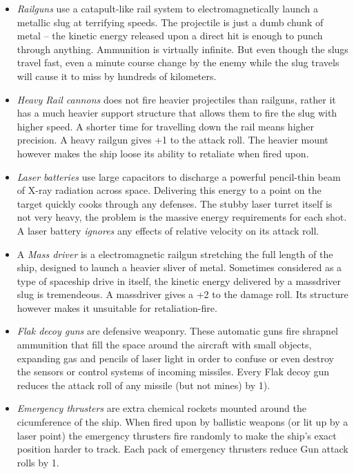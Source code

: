 \documentclass[a4paper,12pt,notitlepage,twocolumn]{article}
\begin{document}
\begin{itemize}

\item \emph{Railguns} use a catapult-like rail system to electromagnetically launch a
  metallic slug at terrifying speeds. The projectile is just a dumb chunk of metal --
  the kinetic energy released upon a direct hit is enough to punch
  through anything. Ammunition is virtually infinite. But even though
  the slugs travel fast, even a minute course change by the enemy while the slug
  travels will cause it to miss by hundreds of kilometers. 
\item \emph{Heavy Rail cannons} does not fire
  heavier projectiles than railguns, rather it has a much heavier
  support structure that allows them to fire the slug with higher speed. A
  shorter time for travelling down the rail means higher precision. A
  heavy railgun gives +1 to the attack roll. The heavier mount however
  makes the ship loose its ability to retaliate when fired upon.
\item \emph{Laser batteries} use large capacitors to discharge a
  powerful pencil-thin beam of X-ray radiation across
  space. Delivering this energy to a point on the target quickly cooks
  through any defenses. The stubby laser turret itself is not very
  heavy, the problem is the massive energy requirements for each
  shot. A laser battery \emph{ignores} any effects of relative
  velocity on its attack roll.
\item A \emph{Mass driver} is a electromagnetic railgun stretching the
  full length of the ship, designed to launch a heavier sliver of
  metal. Sometimes considered as a type of spaceship drive in itself,
  the kinetic energy delivered by a massdriver slug is tremendeous. A
  massdriver gives a +2 to the damage roll. Its structure however
  makes it unsuitable for retaliation-fire. 
\item \emph{Flak decoy guns} are defensive weaponry. These automatic
  guns fire shrapnel ammunition that fill the space around the
  aircraft with small objects, expanding gas and pencils of laser light in order to
  confuse or even destroy the sensors or control systems of incoming missiles. Every Flak
  decoy gun reduces the attack roll of any missile (but not mines) by 1). 
\item \emph{Emergency thrusters} are extra chemical rockets mounted
  around the cicumference of the ship. When fired upon by ballistic
  weapons (or lit up by a laser point) the emergency thrusters fire
  randomly to make the ship's exact position harder to track. Each
  pack of emergency thrusters reduce Gun attack rolls by 1. 
\end{itemize}
\end{document}
